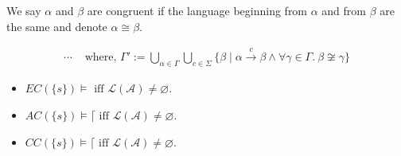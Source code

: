 We say \( \alpha \) and \( \beta \) are congruent if the language beginning from
\( \alpha \) and from \( \beta \) are the same and denote \( \alpha \cong
\beta\).

\begin{definition}
  \begin{align*} \cdots & \text{ where, } \Gamma' :=
    \bigcup\limits_{\alpha \in \Gamma}
    \bigcup\limits_{c \in \Sigma}
    \{
    \beta \mid \alpha \xrightarrow[]c \beta
    \wedge
    \forall \gamma \in \Gamma .\ \beta \not \cong \gamma
    \}
    \tag{CC}
  \end{align*}
\end{definition}

\begin{theorem}
  \begin{itemize}
  \item \(EC(\{s\}) \models \text{ iff }
    \mathcal{L}(\mathcal{A}) \neq \varnothing. \)
  \item \(AC(\{s\}) \models \lceil \text{ iff }
    \mathcal{L}(\mathcal{A}) \neq \varnothing. \)
  \item \(CC(\{s\}) \models \lceil \text{ iff }
    \mathcal{L}(\mathcal{A}) \neq \varnothing. \)
\end{itemize}
\end{theorem}
\fi
